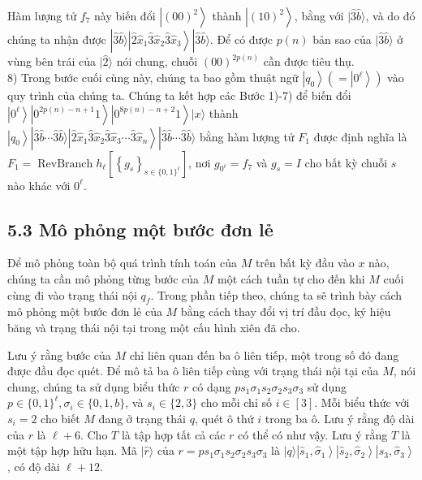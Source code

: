 \documentclass[10pt]{article}
\begin{document}
Hàm lượng tử $f_{7}$ này biến đổi $\left|(00)^{2}\right\rangle$ thành $\left|(10)^{2}\right\rangle$, bằng với $|\hat{3} \hat{b}\rangle$, và do đó chúng ta nhận được $|\hat{3} \hat{b}\rangle\left|\hat{2} \hat{x}_{1} \hat{3} \hat{x}_{2} \hat{3} \hat{x}_{3}\right\rangle|\hat{3} \hat{b}\rangle$. Để có được $p(n)$ bản sao của $|\hat{3} \hat{b}\rangle$ ở vùng bên trái của $|\hat{2}\rangle$ nói chung, chuỗi $(00)^{2 p(n)}$ cần được tiêu thụ.\\
8) Trong bước cuối cùng này, chúng ta bao gồm thuật ngữ $\left|q_{0}\right\rangle\left(=\left|0^{\ell}\right\rangle\right)$ vào quy trình của chúng ta. Chúng ta kết hợp các Bước 1)-7) để biến đổi $\left|0^{\ell}\right\rangle\left|0^{2 p(n)-n+1} 1\right\rangle\left|0^{8 p(n)-n+2} 1\right\rangle|x\rangle$ thành $\left|q_{0}\right\rangle|\hat{3} \hat{b} \cdots \hat{3} \hat{b}\rangle\left|\hat{2} \hat{x}_{1} \hat{3} \hat{x}_{2} \hat{3} \hat{x}_{3} \cdots \hat{3} \hat{x}_{n}\right\rangle|\hat{3} \hat{b} \cdots \hat{3} \hat{b}\rangle$ bằng hàm lượng tử $F_{1}$ được định nghĩa là $F_{1}=\operatorname{RevBranch} h_{\ell}\left[\left\{g_{s}\right\}_{s \in\{0,1\}^{\ell}}\right]$, nơi $g_{0^{\ell}}=f_{7}$ và $g_{s}=I$ cho bất kỳ chuỗi $s$ nào khác với $0^{\ell}$.

\subsection*{5.3 Mô phỏng một bước đơn lẻ}
Để mô phỏng toàn bộ quá trình tính toán của $M$ trên bất kỳ đầu vào $x$ nào, chúng ta cần mô phỏng từng bước của $M$ một cách tuần tự cho đến khi $M$ cuối cùng đi vào trạng thái nội $q_{f}$. Trong phần tiếp theo, chúng ta sẽ trình bày cách mô phỏng một bước đơn lẻ của $M$ bằng cách thay đổi vị trí đầu đọc, ký hiệu băng và trạng thái nội tại trong một cấu hình xiên đã cho.

Lưu ý rằng bước của $M$ chỉ liên quan đến ba ô liên tiếp, một trong số đó đang được đầu đọc quét. Để mô tả ba ô liên tiếp cùng với trạng thái nội tại của $M$, nói chung, chúng ta sử dụng biểu thức $r$ có dạng $p s_{1} \sigma_{1} s_{2} \sigma_{2} s_{3} \sigma_{3}$ sử dụng $p \in\{0,1\}^{\ell}, \sigma_{i} \in\{0,1, b\}$, và $s_{i} \in\{2,3\}$ cho mỗi chỉ số $i \in[3]$. Mỗi biểu thức với $s_{i}=2$ cho biết $M$ đang ở trạng thái $q$, quét ô thứ $i$ trong ba ô. Lưu ý rằng độ dài của $r$ là $\ell+6$. Cho $T$ là tập hợp tất cả các $r$ có thể có như vậy. Lưu ý rằng $T$ là một tập hợp hữu hạn. Mã $|\hat{r}\rangle$ của $r=p s_{1} \sigma_{1} s_{2} \sigma_{2} s_{3} \sigma_{3}$ là $|q\rangle\left|\hat{s}_{1}, \hat{\sigma}_{1}\right\rangle\left|\hat{s}_{2}, \hat{\sigma}_{2}\right\rangle\left|\hat{s}_{3}, \hat{\sigma}_{3}\right\rangle$, có độ dài $\ell+12$.
\end{document}
